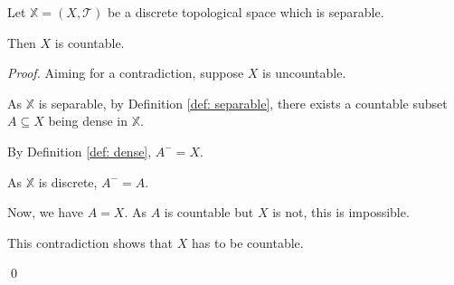 \begin{proposition}
	Let $\mathbb X = (X, \mathcal T)$ be a discrete topological space which is separable.
	
	Then $X$ is countable.
	
	\begin{proof}
		Aiming for a contradiction, suppose $X$ is uncountable.
		
		As $\mathbb X$ is separable, by Definition \ref{def: separable}, there exists a countable subset $A \subseteq X$ being dense in $\mathbb X$.
		
		By Definition \ref{def: dense}, $A^- = X$.
		
		As $\mathbb X$ is discrete, $A^- = A$.
		
		Now, we have $A = X$. As $A$ is countable but $X$ is not, this is impossible.
		
		This contradiction shows that $X$ has to be countable.
		
		\qed
	\end{proof}
\end{proposition}


